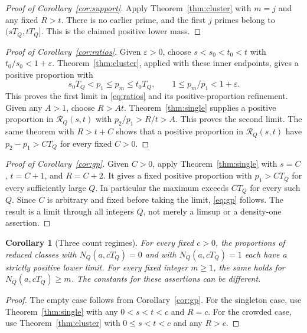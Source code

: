\documentclass[11pt]{article}
\newtheorem{corollary}[theorem]{Corollary}
\theoremstyle{remark}
\numberwithin{equation}{section}
\begin{document}
\begin{proof}[Proof of Corollary~\ref{cor:support}]
Apply Theorem~\ref{thm:cluster} with $m=j$ and any fixed $R>t$.
There is no earlier prime, and the first $j$ primes belong to
$(sT_Q,tT_Q]$. This is the claimed positive lower mass.
\end{proof}

\begin{proof}[Proof of Corollary~\ref{cor:ratios}]
Given $\varepsilon>0$, choose
$s<s_0<t_0<t$ with $t_0/s_0<1+\varepsilon$.
Theorem~\ref{thm:cluster}, applied with these inner endpoints,
gives a positive proportion with
\[
 s_0T_Q<p_1\le p_m\le t_0T_Q,\qquad
 1\le p_m/p_1<1+\varepsilon.
\]
This proves the first limit in \eqref{eq:ratios} and its
positive-proportion refinement.
Given any $A>1$, choose $R>At$.
Theorem~\ref{thm:single} supplies a positive proportion in
$\mathcal R_Q(s,t)$ with
$p_2/p_1>R/t>A$. This proves the second limit.
The same theorem with $R>t+C$ shows that a positive
proportion in $\mathcal R_Q(s,t)$ have
$p_2-p_1>CT_Q$ for every fixed $C>0$.
\end{proof}

\begin{proof}[Proof of Corollary~\ref{cor:gp}]
Given $C>0$, apply Theorem~\ref{thm:single} with
$s=C$, $t=C+1$, and $R=C+2$.
It gives a fixed positive proportion with $p_1>CT_Q$ for
every sufficiently large $Q$. In particular the maximum
exceeds $CT_Q$ for every such $Q$.
Since $C$ is arbitrary and fixed before taking the limit,
\eqref{eq:gp} follows. The result is a limit through all
integers $Q$, not merely a limsup or a density-one assertion.
\end{proof}

\begin{corollary}[Three count regimes]\label{cor:counts}
For every fixed $c>0$, the proportions of reduced classes with
$N_Q(a,cT_Q)=0$ and with $N_Q(a,cT_Q)=1$ each have a
strictly positive lower limit. For every fixed integer $m\ge1$,
the same holds for $N_Q(a,cT_Q)\ge m$.
The constants for these assertions can be different.
\end{corollary}
\begin{proof}
The empty case follows from Corollary~\ref{cor:gp}.
For the singleton case, use Theorem~\ref{thm:single} with
any $0<s<t<c$ and $R=c$.
For the crowded case, use Theorem~\ref{thm:cluster}
with $0\le s<t<c$ and any $R>c$.
\end{proof}
\end{document}
